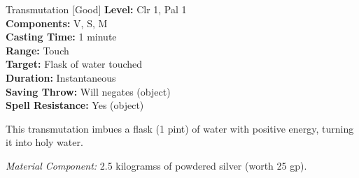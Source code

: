 {Transmutation [Good]}
{
	\textbf{Level:}
	Clr 1, Pal 1\\
	\textbf{Components:}
	V, S, M\\
	\textbf{Casting Time:}
	1 minute\\
	\textbf{Range:}
	Touch\\
	\textbf{Target:}
	Flask of water touched\\
	\textbf{Duration:}
	Instantaneous\\
	\textbf{Saving Throw:}
	Will negates (object)\\
	\textbf{Spell Resistance:}
	Yes (object)\\
}
{
	This transmutation imbues a flask (1 pint) of water with positive energy, turning it into holy water.

	\textit{Material Component:}
	2.5 kilogramss of powdered silver (worth 25 gp).

}
